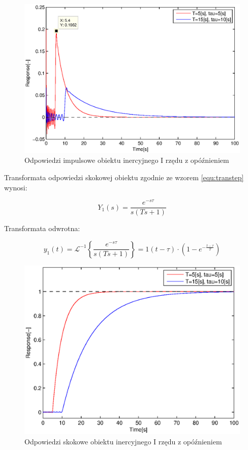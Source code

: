 \documentclass[12pt]{article}
\begin{document}
\begin{figure}[!htb]
	\begin{center}
		\includegraphics[width=14cm]{../res/img/imp6.eps}
	\end{center}
	\caption{Odpowiedzi impulsowe obiektu inercyjnego I rzędu z opóźnieniem}
\end{figure}

\newpage

Transformata odpowiedzi skokowej obiektu zgodnie ze wzorem \eqref{equ:transtep}
wynosi:

\begin{equation*}
	Y_{1}(s)=\frac{e^{-s\tau}}{s(Ts+1)}
\end{equation*}

Transformata odwrotna:

\begin{equation*}
	y_{1}(t)=\mathcal{L}^{-1}\left\{\frac{e^{-s\tau}}{s(Ts+1)}\right\} =
	1(t-\tau)\cdot \left(1-e^{-\frac{t-\tau}{T}}\right)
\end{equation*}

\begin{figure}[!htb]
	\begin{center}
		\includegraphics[width=14cm]{../res/img/step6.eps}
	\end{center}
	\caption{Odpowiedzi skokowe obiektu inercyjnego I rzędu z opóźnieniem}
\end{figure}
\end{document}
